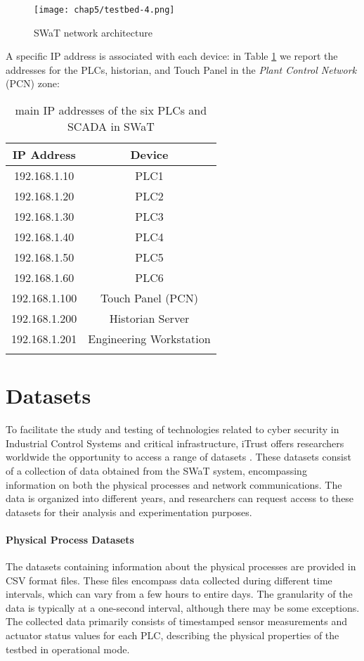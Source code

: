 \begin{figure}[ht]
	\centering
	\texttt{[image: chap5/testbed-4.png]}
	\caption{SWaT network architecture}
	\label{fig:5_swat_network_arch}
\end{figure}

A specific IP address is associated with each device: in Table \ref{table:5_swat_ip_addresses} we report the addresses for the PLCs, historian, and Touch Panel in the \textit{Plant Control Network} (PCN) zone:

\begin{longtable}[c]{| c | c |}
	\hline
	\textbf{IP Address} & \textbf{Device} \\ [0.5ex] 
	\hline
	192.168.1.10 & PLC1 \\
	\hline 
	192.168.1.20 & PLC2 \\
	\hline
	192.168.1.30 & PLC3 \\
	\hline
	192.168.1.40 & PLC4 \\
	\hline
	192.168.1.50 & PLC5 \\
	\hline
	192.168.1.60 & PLC6 \\
	\hline
	192.168.1.100 & {Touch Panel (PCN)} \\
	\hline
	192.168.1.200 & Historian Server \\
	\hline
	192.168.1.201 & Engineering Workstation \\
	\hline
	
	\caption{main IP addresses of the six PLCs and SCADA in SWaT}
	\label{table:5_swat_ip_addresses}
\end{longtable}

\section{Datasets}
\label{sec:5_swat_datasets}

To facilitate the study and testing of technologies related to cyber security in Industrial Control Systems and critical infrastructure, iTrust offers researchers worldwide the opportunity to access a range of datasets \cite{swat_datasets}. These datasets consist of a collection of data obtained from the SWaT system, encompassing information on both the physical processes and network communications. The data is organized into different years, and researchers can request access to these datasets for their analysis and experimentation purposes.

\bigskip
\paragraph{Physical Process Datasets}
The datasets containing information about the physical processes are provided in CSV format files. These files encompass data collected during different time intervals, which can vary from a few hours to entire days. The granularity of the data is typically at a one-second interval, although there may be some exceptions. The collected data primarily consists of timestamped sensor measurements and actuator status values for each PLC, describing the physical properties of the testbed in operational mode.

